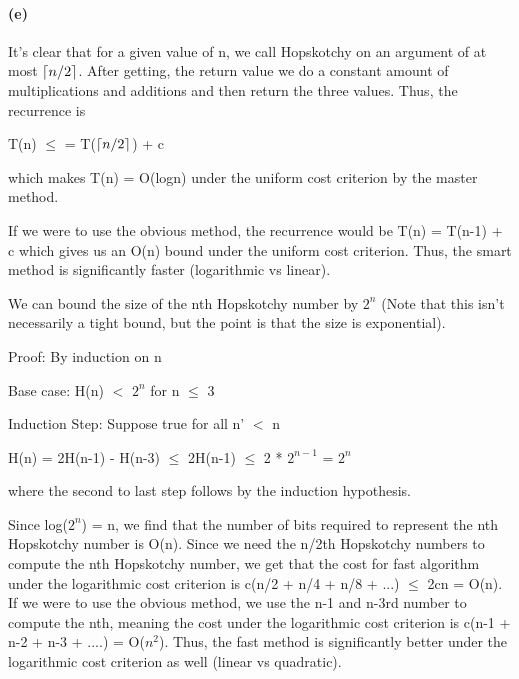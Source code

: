 \documentclass[11pt,a4paper]{article}
\DeclarePairedDelimiter\ceil{\lceil}{\rceil}
\begin{document}
\paragraph*{(e)}
It's clear that for a given value of n, we call Hopskotchy on an argument of at most $\ceil*{n/2}$. After getting, the return value we do a constant amount of multiplications and additions and then return the three values. Thus, the recurrence is 

T(n) $\leq$ = T($\ceil*{n/2}$) + c

which makes T(n) = O(logn) under the uniform cost criterion by the master method.

If we were to use the obvious method, the recurrence would be T(n) = T(n-1) + c which gives us an O(n) bound under the uniform cost criterion. Thus, the smart method is significantly faster (logarithmic vs linear).

We can bound the size of the nth Hopskotchy number by $2^{n}$ (Note that this isn't necessarily a tight bound, but the point is that the size is exponential).


Proof: By induction on n

Base case: H(n) $<$ $2^{n}$ for n $\leq$ 3

Induction Step: Suppose true for all n' $<$ n

H(n) = 2H(n-1) - H(n-3) $\leq$ 2H(n-1) $\leq$ 2 * $2^{n-1}$ = $2^{n}$

where the second to last step follows by the induction hypothesis. 

Since log($2^{n}$) = n, we find that the number of bits required to represent the nth Hopskotchy number is O(n). Since we need the n/2th Hopskotchy numbers to compute the nth Hopskotchy number, we get that the cost for fast algorithm under the logarithmic cost criterion is c(n/2 + n/4 + n/8 + ...) $\leq$ 2cn = O(n). If we were to use the obvious method, we use the n-1 and n-3rd number to compute the nth, meaning the cost under the logarithmic cost criterion is c(n-1 + n-2 + n-3 + ....) = O($n^{2}$). Thus, the fast method is significantly better under the logarithmic cost criterion as well (linear vs quadratic).
\end{document}
